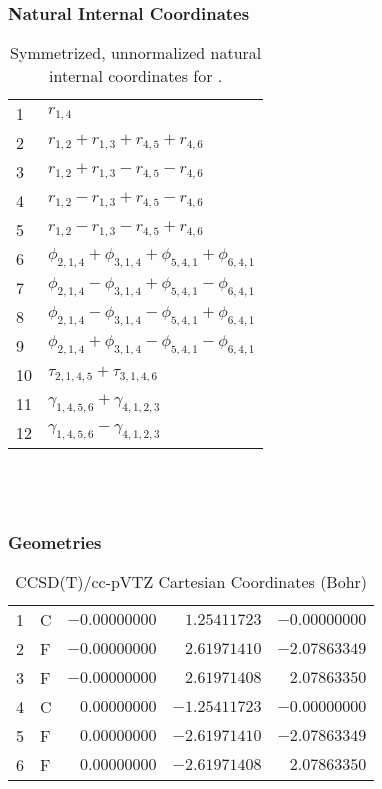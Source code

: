 \documentclass[10pt,oneside]{article}
\begin{document}
\subsubsection*{Natural Internal Coordinates}
\begin{table}[h!]
\centering
\caption{Symmetrized, unnormalized natural internal coordinates for .}
\small
\begin{tabular}{ll}
  1   & $r_{1,4}$ \\
  2   & $r_{1,2} + r_{1,3} + r_{4,5} + r_{4,6}$ \\
  3   & $r_{1,2} + r_{1,3} - r_{4,5} - r_{4,6}$ \\
  4   & $r_{1,2} - r_{1,3} + r_{4,5} - r_{4,6}$ \\
  5   & $r_{1,2} - r_{1,3} - r_{4,5} + r_{4,6}$ \\
  6   & $\phi_{2,1,4} + \phi_{3,1,4} + \phi_{5,4,1} + \phi_{6,4,1}$ \\
  7   & $\phi_{2,1,4} - \phi_{3,1,4} + \phi_{5,4,1} - \phi_{6,4,1}$ \\
  8   & $\phi_{2,1,4} - \phi_{3,1,4} - \phi_{5,4,1} + \phi_{6,4,1}$ \\
  9   & $\phi_{2,1,4} + \phi_{3,1,4} - \phi_{5,4,1} - \phi_{6,4,1}$ \\
  10  & $\tau_{2,1,4,5} + \tau_{3,1,4,6}$ \\
  11  & $\gamma_{1,4,5,6} + \gamma_{4,1,2,3}$ \\
  12  & $\gamma_{1,4,5,6} - \gamma_{4,1,2,3}$ \\
\end{tabular}
\end{table}

\clearpage

\subsection{\ \ \ }

\subsubsection*{Geometries}
\begin{table}[h!]
\centering
\caption{CCSD(T)/cc-pVTZ Cartesian Coordinates (Bohr)}
\begin{tabular}{llrrr}
1  & C  & $-0.00000000$ & $ 1.25411723$ & $-0.00000000$ \\
2  & F  & $-0.00000000$ & $ 2.61971410$ & $-2.07863349$ \\
3  & F  & $-0.00000000$ & $ 2.61971408$ & $ 2.07863350$ \\
4  & C  & $ 0.00000000$ & $-1.25411723$ & $-0.00000000$ \\
5  & F  & $ 0.00000000$ & $-2.61971410$ & $-2.07863349$ \\
6  & F  & $ 0.00000000$ & $-2.61971408$ & $ 2.07863350$ \\
\end{tabular}
\end{table}
\end{document}
